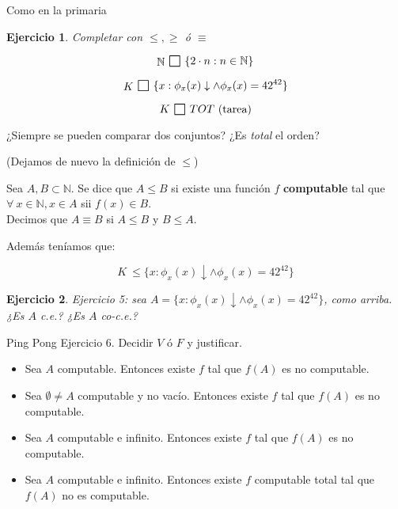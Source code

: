 \documentclass[11pt]{beamer}
\def\key#1{\{#1\}}
\def\N{\mathbb{N}}
\def\bs{\mathlarger{\mathlarger{\mathlarger{\square}}}}
\newtheorem{exercise}{Ejercicio}
\begin{document}
\begin{frame}{Como en la primaria}
	\begin{exercise}
	Completar con $\leq, \geq$ ó $\equiv$
	
	\begin{equation*}
	\raisebox{-1pt}{$\N$}\ \raisebox{-2pt}{$\bs$}\ \key{2\cdot n : n \in \N}
	\end{equation*}\pause
	
	\begin{equation*}
	\raisebox{-1pt}{$K$}\ \raisebox{-2pt}{$\bs$}\ \key{x : \phi_x(x) \downarrow \land \phi_x(x) = 42^{42}}
	\end{equation*}\pause
	
	\begin{equation*}
	K\ \raisebox{-2pt}{$\bs$}\ TOT\text{ (tarea)}
	\end{equation*}\pause
	\end{exercise}
	
	¿Siempre se pueden comparar dos conjuntos? ¿Es \textit{total} el orden? \pause
\end{frame}

\begin{frame}{}
	(Dejamos de nuevo la definición de $\leq$)
	
	\begin{definition}
		Sea $A,B \subset \N$. Se dice que $A \leq B$ si existe una función $f$ \textbf{computable} tal que $\forall\ x \in \N, x \in A$ sii $f(x) \in B$. \\
		
	Decimos que $A \equiv B$ si $A\leq B$ y $B \leq A$.
	\end{definition}
	
	Además teníamos que:
	
	\begin{equation*}
	K\ \leq \key{x : \phi_x(x) \downarrow \land \phi_x(x) = 42^{42}}
	\end{equation*}


	\begin{exercise}
	Ejercicio 5: sea $A =\key{x : \phi_x(x) \downarrow \land \phi_x(x) = 42^42}$, como arriba.
	¿Es $A$ c.e.? ¿Es $A$ co-c.e.?
	\end{exercise}	
\end{frame}

\begin{frame}{Ping Pong}
Ejercicio 6. Decidir $V$ ó $F$ y justificar.

\begin{itemize}
	\item Sea $A$ computable. Entonces existe $f$ tal que $f(A)$ es no computable. \pause
	\item Sea $\emptyset \neq A$ computable y no vacío. Entonces existe $f$ tal que $f(A)$ es no computable.\pause
	\item Sea $A$ computable e infinito. Entonces existe $f$ tal que $f(A)$ es no computable.\pause
	\item Sea $A$ computable e infinito. Entonces existe $f$ computable total tal que $f(A)$ no es computable. \pause
\end{itemize}
	
\end{frame}
\end{document}
